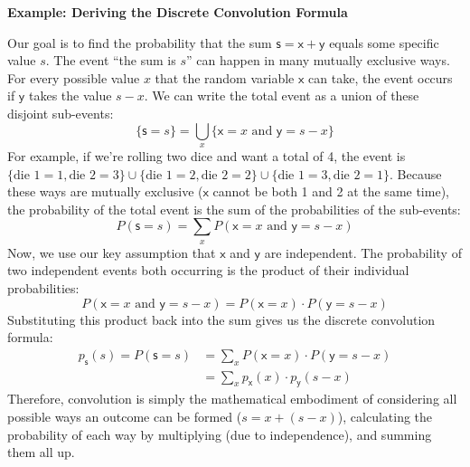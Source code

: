 \begin{exampleBox}
    \textbf{Example: Deriving the Discrete Convolution Formula}

    Our goal is to find the probability that the sum $\mathsf{s} = \mathsf{x} + \mathsf{y}$ equals some specific value $s$. The event ``the sum is $s$'' can happen in many mutually exclusive ways. For every possible value $x$ that the random variable $\mathsf{x}$ can take, the event occurs if $\mathsf{y}$ takes the value $s-x$. We can write the total event as a union of these disjoint sub-events:
    \begin{equation}
        \{\mathsf{s} = s\} = \bigcup_{x} \{\mathsf{x}=x \text{ and } \mathsf{y}=s-x\}
    \end{equation}
    For example, if we're rolling two dice and want a total of 4, the event is $\{\text{die 1}=1, \text{die 2}=3\} \cup \{\text{die 1}=2, \text{die 2}=2\} \cup \{\text{die 1}=3, \text{die 2}=1\}$. Because these ways are mutually exclusive ($\mathsf{x}$ cannot be both 1 and 2 at the same time), the probability of the total event is the sum of the probabilities of the sub-events:
    \begin{equation}
        P(\mathsf{s}=s) = \sum_{x} P(\mathsf{x}=x \text{ and } \mathsf{y}=s-x)
    \end{equation}
    Now, we use our key assumption that $\mathsf{x}$ and $\mathsf{y}$ are independent. The probability of two independent events both occurring is the product of their individual probabilities:
    \begin{equation}
        P(\mathsf{x}=x \text{ and } \mathsf{y}=s-x) = P(\mathsf{x}=x) \cdot P(\mathsf{y}=s-x)
    \end{equation}
    Substituting this product back into the sum gives us the discrete convolution formula:
    \begin{align}
        p_{\mathsf{s}}(s) = P(\mathsf{s}=s) &= \sum_{x} P(\mathsf{x}=x) \cdot P(\mathsf{y}=s-x) \nonumber\\
        &= \sum_{x} p_{\mathsf{x}}(x) \cdot p_{\mathsf{y}}(s-x)
    \end{align}
    Therefore, convolution is simply the mathematical embodiment of considering all possible ways an outcome can be formed ($s = x + (s-x)$), calculating the probability of each way by multiplying (due to independence), and summing them all up.
\end{exampleBox}

